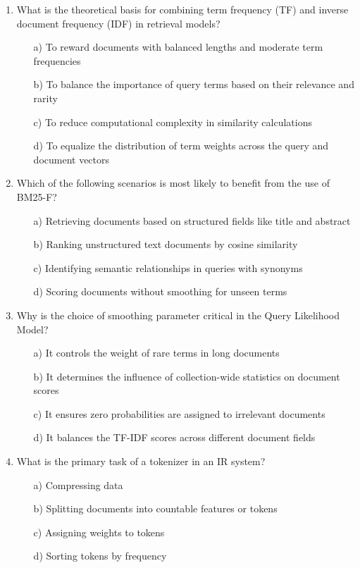 \documentclass[8pt]{extarticle}
\begin{document}
\begin{multicols}{2}
\begin{enumerate}
\item What is the theoretical basis for combining term frequency (TF) and inverse document frequency (IDF) in retrieval models?
\begin{itemize}
    \item[a)] To reward documents with balanced lengths and moderate term frequencies
    \item[b)] To balance the importance of query terms based on their relevance and rarity
    \item[c)] To reduce computational complexity in similarity calculations
    \item[d)] To equalize the distribution of term weights across the query and document vectors
\end{itemize}
 

\item Which of the following scenarios is most likely to benefit from the use of BM25-F?
\begin{itemize}
    \item[a)] Retrieving documents based on structured fields like title and abstract
    \item[b)] Ranking unstructured text documents by cosine similarity
    \item[c)] Identifying semantic relationships in queries with synonyms
    \item[d)] Scoring documents without smoothing for unseen terms
\end{itemize}
 

\item Why is the choice of smoothing parameter critical in the Query Likelihood Model?
\begin{itemize}
    \item[a)] It controls the weight of rare terms in long documents
    \item[b)] It determines the influence of collection-wide statistics on document scores
    \item[c)] It ensures zero probabilities are assigned to irrelevant documents
    \item[d)] It balances the TF-IDF scores across different document fields
\end{itemize}

\item What is the primary task of a tokenizer in an IR system?
\begin{itemize}
\item[a)] Compressing data
\item[b)] Splitting documents into countable features or tokens
\item[c)] Assigning weights to tokens
\item[d)] Sorting tokens by frequency
\end{itemize}


\end{enumerate}
\end{multicols}
\end{document}
